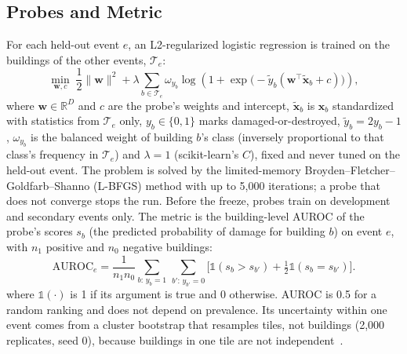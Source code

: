 \documentclass{ieeeaccess}
\begin{document}
\subsection{Probes and Metric}
For each held-out event $e$, an L2-regularized logistic regression is trained on the buildings of the other events, $\mathcal{T}_e$:
\begin{equation}
\min_{\mathbf{w},c}\;\frac{1}{2}\|\mathbf{w}\|^2+\lambda\sum_{b\in\mathcal{T}_e}\omega_{y_b}\log\!\left(1+\exp\!\big(-\tilde y_b(\mathbf{w}^{\top}\tilde{\mathbf{x}}_b+c)\big)\right),
\label{eq:probe}
\end{equation}
where $\mathbf{w}\in\mathbb{R}^{D}$ and $c$ are the probe's weights and intercept, $\tilde{\mathbf{x}}_b$ is $\mathbf{x}_b$ standardized with statistics from $\mathcal{T}_e$ only, $y_b\in\{0,1\}$ marks damaged-or-destroyed, $\tilde y_b=2y_b-1$, $\omega_{y_b}$ is the balanced weight of building $b$'s class (inversely proportional to that class's frequency in $\mathcal{T}_e$) and $\lambda=1$ (scikit-learn's $C$), fixed and never tuned on the held-out event. The problem is solved by the limited-memory Broyden--Fletcher--Goldfarb--Shanno (L-BFGS) method with up to 5,000 iterations; a probe that does not converge stops the run. Before the freeze, probes train on development and secondary events only. The metric is the building-level AUROC of the probe's scores $s_b$ (the predicted probability of damage for building $b$) on event $e$, with $n_1$ positive and $n_0$ negative buildings:
\begin{equation}
\mathrm{AUROC}_e=\frac{1}{n_1n_0}\!\sum_{b:\,y_b=1}\,\sum_{b':\,y_{b'}=0}\!\big[\mathbb{1}(s_b{>}s_{b'})+\tfrac{1}{2}\mathbb{1}(s_b{=}s_{b'})\big].
\label{eq:auroc}
\end{equation}
where $\mathbb{1}(\cdot)$ is 1 if its argument is true and 0 otherwise. AUROC is 0.5 for a random ranking and does not depend on prevalence. Its uncertainty within one event comes from a cluster bootstrap that resamples tiles, not buildings (2,000 replicates, seed 0), because buildings in one tile are not independent~\cite{field2007bootstrap}.
\end{document}

